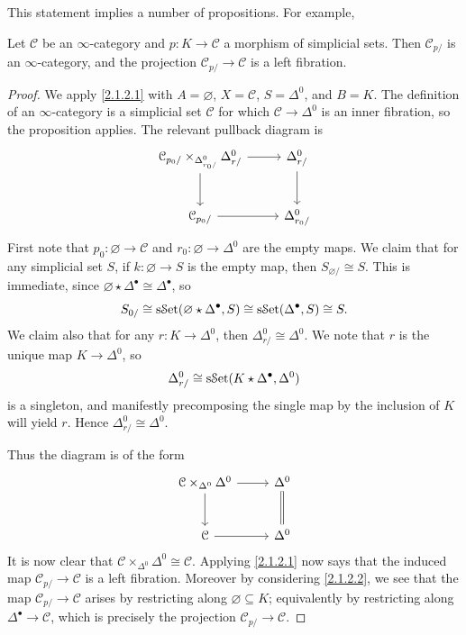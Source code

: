 This statement implies a number of propositions. For example,

\begin{corollary}[Joyal]\label{2.1.2.3}
	Let $\mathcal{C} $ be an $\infty $-category and $p : K \to \mathcal{C} $ a morphism of simplicial sets. Then $\mathcal{C} _{p/} $ is an $\infty $-category, and the projection $\mathcal{C} _{p/} \to \mathcal{C} $ is a left fibration.
\end{corollary}
\begin{proof}
	We apply \cref{2.1.2.1} with $A=\varnothing $, $X=\mathcal{C} $, $S=\Delta ^0$, and $B=K$. The definition of an $\infty $-category is a simplicial set $\mathcal{C} $ for which $\mathcal{C} \to \Delta ^0$ is an inner fibration, so the proposition applies. The relevant pullback diagram is
	\[\begin{tikzcd}[row sep = 2.5em, column sep = 2.5em]
	\mathcal{C} _{p_0/} \times _{\Delta ^0_{r_0/} } \Delta^0_{r/} \ar[r] \ar[d]  & \Delta ^0_{r/}\ar[d]  \\
	\mathcal{C}_{p_0/} \ar[r]  & \Delta^0_{r_0/} 
	\end{tikzcd}\]
	First note that $p_0: \varnothing  \to \mathcal{C} $ and $r_0 : \varnothing  \to \Delta ^0$ are the empty maps. We claim that for any simplicial set $S$, if $k : \varnothing  \to S$ is the empty map, then $S_{\varnothing /} \cong S$. This is immediate, since $\varnothing \star \Delta ^{\bullet} \cong \Delta ^{\bullet} $, so
	\[
		S_{0/} \cong \mathrm{s}\mathcal{S}\mathrm{et} (\varnothing \star \Delta^{\bullet} ,S) \cong \mathrm{s}\mathcal{S}\mathrm{et} (\Delta ^{\bullet} ,S)\cong S
	.\]
	We claim also that for any $r : K \to \Delta ^0$, then $\Delta _{r/} ^0\cong \Delta ^0$. We note that $r$ is the unique map $K\to \Delta ^0$, so
	\[
		\Delta _{r/} ^0 \cong \mathrm{s}\mathcal{S}\mathrm{et} (K\star \Delta ^{\bullet},\Delta ^0)
	\]
	is a singleton, and manifestly precomposing the single map by the inclusion of $K$ will yield $r$. Hence $\Delta _{r/} ^0 \cong \Delta ^0$.
	
	Thus the diagram is of the form
	\[\begin{tikzcd}[row sep = 2.5em, column sep = 2.5em]
	\mathcal{C} \times_{\Delta ^0} \Delta ^0 \ar[r] \ar[d]  & \Delta ^0\ar[equals, d]  \\
	\mathcal{C} \ar[r]  & \Delta ^0
	\end{tikzcd}\]
	It is now clear that $\mathcal{C} \times _{\Delta ^0} \Delta ^0 \cong \mathcal{C} $. Applying \cref{2.1.2.1} now says that the induced map $\mathcal{C} _{p/} \to \mathcal{C} $ is a left fibration. Moreover by considering \cref{2.1.2.2}, we see that the map $\mathcal{C} _{p/} \to \mathcal{C} $ arises by restricting along $\varnothing \subseteq K$; equivalently by restricting along $\Delta ^{\bullet} \to \mathcal{C} $, which is precisely the projection $\mathcal{C} _{p/} \to \mathcal{C} $.


\end{proof}
